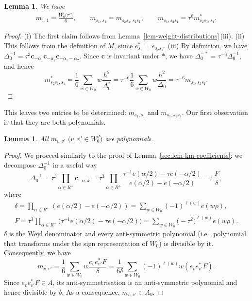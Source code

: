 \documentclass[pdftex]{sigma}
\newtheorem{Lemma}[Theorem]{Lemma}
\theoremstyle{definition}
\numberwithin{equation}{section}
\begin{document}
\begin{Lemma}
 We have
 \begin{align*}
 m_{1,1} = \frac{W_0\bigl(\tau^2\bigr)}{6},\qquad
 m_{s_1,s_1} = m_{s_2s_1,s_2s_1},\qquad
 m_{s_1,s_2s_1} = \tau^6 m_{s_2s_1,s_1}^*.
 \end{align*}
\end{Lemma}
\begin{proof} (i) The first claim follows from Lemma~\ref{lem-weight-distributions}\,(iii).
(ii) This follows from the definition of $M$, since $e_{s_1}^*=e_{s_2s_1}$.
(iii) By definition, we have
$
 \Delta_0^{-1} = \tau^3 \bm{c}_{-\alpha_1}\bm{c}_{-\alpha_2}\bm{c}_{-\alpha_1-\alpha_2}$.
 Since $\bm{c}$ is invariant under $*$, we have
 $\Delta_0^{-*} = \tau^{-6} \Delta_0^{-1}$, and hence
 \[
 m_{s_2s_1,s_1}^* = \frac{1}{6}\sum_{w\in W_0}
 w \frac{h^2}{\Delta_0^*}
 = \tau^{-6} \frac{1}{6}\sum_{w\in W_0} w\frac{h^2}{\Delta_0}
 = \tau^{-6} m_{s_1,s_2s_1}.\tag*{\qed}
 \]
\renewcommand{\qed}{}
\end{proof}

This leaves two entries to be determined: $m_{s_1,s_1}$ and $m_{s_1,s_1s_2}$. Our first
observation is that they are both polynomials.

\begin{Lemma}\label{sec:lem-shi-polynomial-weight}
 All $m_{v,v'}$ $\big(v,v'\in W_0^J\big)$ are polynomials.
\end{Lemma}
\begin{proof}
 We proceed similarly to the proof of Lemma~\ref{sec:lem-km-coefficients}: we
 decompose $\Delta_0^{-1}$ in a useful way
 \[
 \Delta_0^{-1} = \tau^3 \prod_{\alpha\in R^+} \bm{c}_{-\alpha,k}
 = \tau^3 \prod_{\alpha\in R^+} \frac{\tau^{-1} e(\alpha/2)-\tau e(-\alpha/2)}{e(\alpha/2)-e(-\alpha/2)}
 =: \frac{F}{\delta},
 \]
 where
 \begin{gather*}
 \delta = \prod_{\alpha\in R^+} (e(\alpha/2)-e(-\alpha/2))= \sum_{w\in W_0} (-1)^{\ell(w)} e(w\rho),\\
F = \tau^3\prod_{\alpha\in R^+} \bigl(\tau^{-1}e(\alpha/2) - \tau e(-\alpha/2)\bigr)= \sum_{w\in W_0} \bigl(-\tau^2\bigr)^{\ell(w)} e(w\rho).
 \end{gather*}
 $\delta$ is the Weyl denominator and every anti-symmetric polynomial (i.e.,
 polynomial that transforms under the sign representation of $W_0$) is divisible by
 it. Consequently, we have
 \[
 m_{v,v'} = \frac{1}{6}\sum_{w\in W_0} w \frac{e_v e_{v'}^* F}{\delta}
 = \frac{1}{6\delta} \sum_{w\in W_0} (-1)^{\ell(w)} w (e_v e_{v'}^* F).
 \]
 Since $e_ve_{v'}^* F\in A$, its anti-symmetrisation is an anti-symmetric polynomial
 and hence divisible by $\delta$. As a consequence, $m_{v,v'}\in A_0$.
\end{proof}
\end{document}

